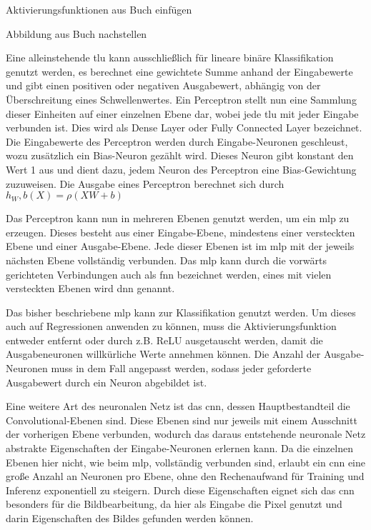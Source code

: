 Aktivierungsfunktionen aus Buch einfügen

Abbildung aus Buch nachstellen

Eine alleinstehende \ac{tlu} kann ausschließlich für lineare binäre Klassifikation genutzt werden, es berechnet eine gewichtete Summe anhand der Eingabewerte und gibt einen positiven oder negativen Ausgabewert, abhängig von der Überschreitung eines Schwellenwertes. Ein Perceptron stellt nun eine Sammlung dieser Einheiten auf einer einzelnen Ebene dar, wobei jede \ac{tlu} mit jeder Eingabe verbunden ist. Dies wird als Dense Layer oder Fully Connected Layer bezeichnet. Die Eingabewerte des Perceptron werden durch Eingabe-Neuronen geschleust, wozu zusätzlich ein Bias-Neuron gezählt wird. Dieses Neuron gibt konstant den Wert 1 aus und dient dazu, jedem Neuron des Perceptron eine Bias-Gewichtung zuzuweisen. Die Ausgabe eines Perceptron berechnet sich durch \(h_W,b(X)=\rho(XW+b)\) \cite[vgl. S. 284 ff.]{Geron2019}

Das Perceptron kann nun in mehreren Ebenen genutzt werden, um ein \ac{mlp} zu erzeugen. Dieses besteht aus einer Eingabe-Ebene, mindestens einer versteckten Ebene und einer Ausgabe-Ebene. Jede dieser Ebenen ist im \ac{mlp} mit der jeweils nächsten Ebene vollständig verbunden. Das \ac{mlp} kann durch die vorwärts gerichteten Verbindungen auch als \ac{fnn} bezeichnet werden, eines mit vielen versteckten Ebenen wird \ac{dnn} genannt. \cite[vgl. S. 284 ff.]{Geron2019}

Das bisher beschriebene \ac{mlp} kann zur Klassifikation genutzt werden. Um dieses auch auf Regressionen anwenden zu können, muss die Aktivierungsfunktion entweder entfernt oder durch z.B. ReLU ausgetauscht werden, damit die Ausgabeneuronen willkürliche Werte annehmen können. Die Anzahl der Ausgabe-Neuronen muss in dem Fall angepasst werden, sodass jeder geforderte Ausgabewert durch ein Neuron abgebildet ist. \cite[vgl. S. 292 ff.]{Geron2019}

Eine weitere Art des neuronalen Netz ist das \ac{cnn}, dessen Hauptbestandteil die Convolutional-Ebenen sind. Diese Ebenen sind nur jeweils mit einem Ausschnitt der vorherigen Ebene verbunden, wodurch das daraus entstehende neuronale Netz abstrakte Eigenschaften der Eingabe-Neuronen erlernen kann. Da die einzelnen Ebenen hier nicht, wie beim \ac{mlp}, vollständig verbunden sind, erlaubt ein \ac{cnn} eine große Anzahl an Neuronen pro Ebene, ohne den Rechenaufwand für Training und Inferenz exponentiell zu steigern. Durch diese Eigenschaften eignet sich das \ac{cnn} besonders für die Bildbearbeitung, da hier als Eingabe die Pixel genutzt und darin Eigenschaften des Bildes gefunden werden können. \cite[vgl. S. 447 f.]{Geron2019}


